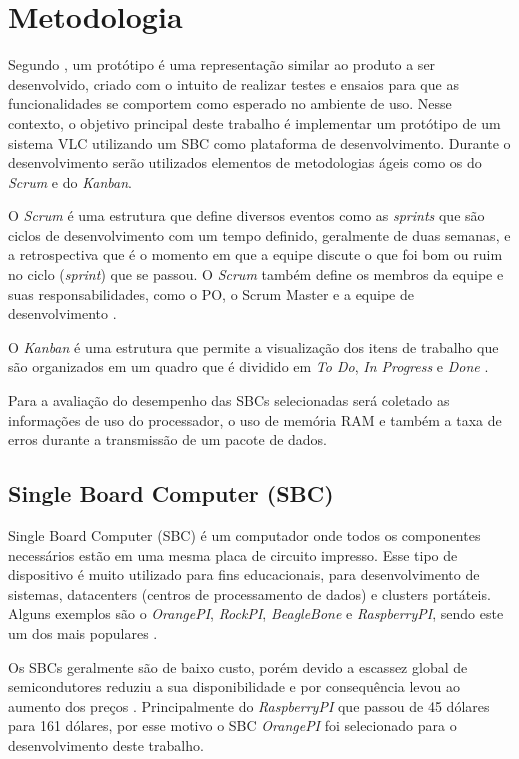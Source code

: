 \chapter{Metodologia}

Segundo , um protótipo é uma representação similar ao produto a ser desenvolvido, criado com o intuito de realizar testes e ensaios para que as funcionalidades se comportem como esperado no ambiente de uso. Nesse contexto, o objetivo principal deste trabalho é implementar um protótipo de um sistema VLC utilizando um SBC como plataforma de desenvolvimento. Durante o desenvolvimento serão utilizados elementos de metodologias ágeis como os do \textit{Scrum} e do \textit{Kanban}.

O \textit{Scrum} é uma estrutura que define diversos eventos como as \textit{sprints} que são ciclos de desenvolvimento com um tempo definido, geralmente de duas semanas, e a retrospectiva que é o momento em que a equipe discute o que foi bom ou ruim no ciclo (\textit{sprint}) que se passou. O \textit{Scrum} também define os membros da equipe e suas responsabilidades, como o PO, o Scrum Master e a equipe de desenvolvimento \cite{scrum}. 

O \textit{Kanban} é uma estrutura que permite a visualização dos itens de trabalho que são organizados em um quadro que é dividido em \textit{To Do}, \textit{In Progress} e \textit{Done} \cite{kanbam}.

Para a avaliação do desempenho das SBCs selecionadas será coletado as informações de uso do processador, o uso de memória RAM e também a taxa de erros durante a transmissão de um pacote de dados.

\section{Single Board Computer (SBC)}

Single Board Computer (SBC) é um computador onde todos os componentes necessários estão em uma mesma placa de circuito impresso. Esse tipo de dispositivo é muito utilizado para fins educacionais, para desenvolvimento de sistemas, datacenters (centros  de  processamento  de  dados) e clusters portáteis. Alguns exemplos são o \textit{OrangePI}, \textit{RockPI}, \textit{BeagleBone} e \textit{RaspberryPI}, sendo este um dos mais populares \cite{SBC_edu}.

Os SBCs geralmente são de baixo custo, porém devido a escassez global de semicondutores reduziu a sua disponibilidade e por consequência levou ao aumento dos preços \cite{zeng_2022}. Principalmente do \textit{RaspberryPI} que passou de 45 dólares para 161 dólares, por esse motivo o SBC \textit{OrangePI} foi selecionado para o desenvolvimento deste trabalho.


